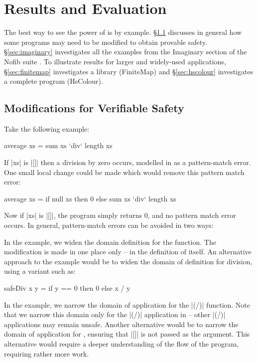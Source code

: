 \section{Results and Evaluation}
\label{sec:results}

The best way to see the power of \catch{} is by example. \S\ref{sec:safety} discusses in general how some programs may need to be modified to obtain provable safety. \S\ref{sec:imaginary} investigates all the examples from the Imaginary section of the Nofib suite \cite{nofib}. To illustrate results for larger and widely-used applications, \S\ref{sec:finitemap} investigates a library (FiniteMap) and \S\ref{sec:hscolour} investigates a complete program (HsColour).


\subsection{Modifications for Verifiable Safety}
\label{sec:safety}

Take the following example:

\begin{code}
average xs = sum xs `div` length xs
\end{code}

If |xs| is |[]| then a division by zero occurs, modelled in \catch{} as a pattern-match error. One small local change could be made which would remove this pattern match error:

\begin{code}
average xs = if null xs then 0 else sum xs `div` length xs
\end{code}

\noindent Now if |xs| is |[]|, the program simply returns 0, and no pattern match error occurs. In general, pattern-match errors can be avoided in two ways:

 In the example, we widen the domain definition for the  function. The modification is made in one place only -- in the definition of  itself. An alternative approach to the  example would be to widen the domain of definition for division, using a variant such as:

\begin{code}
safeDiv x y = if y == 0 then 0 else x / y
\end{code}


 In the example, we narrow the domain of application for the |(/)| function.  Note that we narrow this domain only for the |(/)| application in  -- other |(/)| applications may remain unsafe. Another alternative would be to narrow the domain of application for , ensuring that |[]| is not passed as the argument. This alternative would require a deeper understanding of the flow of the program, requiring rather more work.

